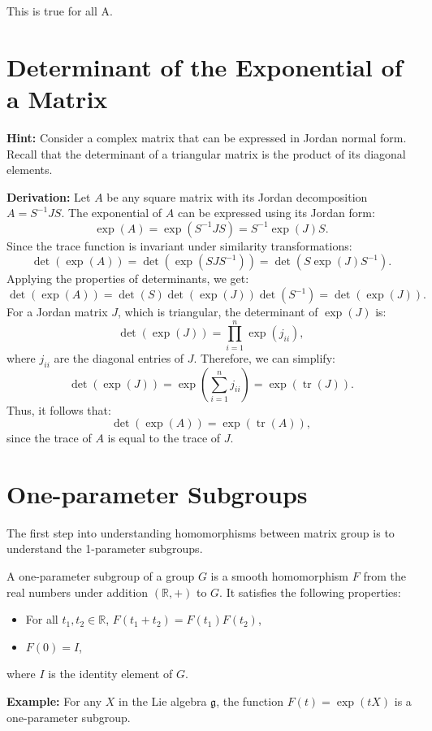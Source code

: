 \documentclass{article}
\begin{document}
This is true for all A. 

\section*{Determinant of the Exponential of a Matrix}

\textbf{Hint:} Consider a complex matrix that can be expressed in Jordan normal form. Recall that the determinant of a triangular matrix is the product of its diagonal elements.

\textbf{Derivation:}
Let \( A \) be any square matrix with its Jordan decomposition \( A = S^{-1}JS \). The exponential of \( A \) can be expressed using its Jordan form:
\[
\exp(A) = \exp(S^{-1}JS) = S^{-1}\exp(J)S.
\]
Since the trace function is invariant under similarity transformations:
\[
\det(\exp(A)) = \det(\exp(SJS^{-1})) = \det(S \exp(J) S^{-1}).
\]
Applying the properties of determinants, we get:
\[
\det(\exp(A)) = \det(S) \det(\exp(J)) \det(S^{-1}) = \det(\exp(J)).
\]
For a Jordan matrix \( J \), which is triangular, the determinant of \( \exp(J) \) is:
\[
\det(\exp(J)) = \prod_{i=1}^n \exp(j_{ii}),
\]
where \( j_{ii} \) are the diagonal entries of \( J \). Therefore, we can simplify:
\[
\det(\exp(J)) = \exp\left(\sum_{i=1}^n j_{ii}\right) = \exp(\operatorname{tr}(J)).
\]
Thus, it follows that:
\[
\det(\exp(A)) = \exp(\operatorname{tr}(A)),
\]
since the trace of \( A \) is equal to the trace of \( J \).


\section{One-parameter Subgroups}
The first step into understanding homomorphisms between matrix group is to understand the 1-parameter subgroups.

\begin{theorem}
    A one-parameter subgroup of a group \( G \) is a smooth homomorphism \( F \) from the real numbers under addition \((\mathbb{R}, +)\) to \( G \). It satisfies the following properties:
\begin{itemize}
  \item For all \( t_1, t_2 \in \mathbb{R} \), \( F(t_1 + t_2) = F(t_1)F(t_2) \),
  \item \( F(0) = I \),
\end{itemize}
where \( I \) is the identity element of \( G \). 
\end{theorem}

\textbf{Example:} For any \( X \) in the Lie algebra \(\mathfrak{g}\), the function \( F(t) = \exp(tX) \) is a one-parameter subgroup.
\end{document}
